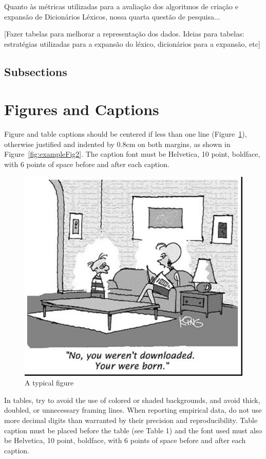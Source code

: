 \documentclass[12pt]{article}
\begin{document}
Quanto às métricas utilizadas para a avaliação dos algoritmos de criação e expansão de Dicionários Léxicos, nossa quarta questão de pesquisa...

[Fazer tabelas para melhorar a representação dos dados. Ideias para tabelas: estratégias utilizadas para a expansão do léxico, dicionários para a expansão, etc]

\subsection{Subsections}

\section{Figures and Captions}\label{sec:figs}


Figure and table captions should be centered if less than one line
(Figure~\ref{fig:exampleFig1}), otherwise justified and indented by 0.8cm on
both margins, as shown in Figure~\ref{fig:exampleFig2}. The caption font must
be Helvetica, 10 point, boldface, with 6 points of space before and after each
caption.

\begin{figure}[ht]
\centering
\includegraphics[width=.5\textwidth]{fig1.jpg}
\caption{A typical figure}
\label{fig:exampleFig1}
\end{figure}

In tables, try to avoid the use of colored or shaded backgrounds, and avoid
thick, doubled, or unnecessary framing lines. When reporting empirical data,
do not use more decimal digits than warranted by their precision and
reproducibility. Table caption must be placed before the table (see Table 1)
and the font used must also be Helvetica, 10 point, boldface, with 6 points of
space before and after each caption.



\end{document}
